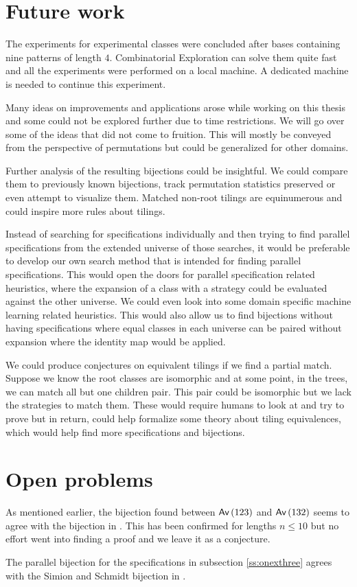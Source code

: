 \label{ch:conclusion}

\section{Future work}\label{s:fw}
The experiments for experimental classes were concluded after bases containing nine patterns of length $4$. Combinatorial Exploration can solve them quite fast and all the experiments were performed on a local machine. A dedicated machine is needed to continue this experiment.

Many ideas on improvements and applications arose while working on this thesis and some could not be explored further due to time restrictions. We will go over some of the ideas that did not come to fruition. This will mostly be conveyed from the perspective of permutations but could be generalized for other domains.

Further analysis of the resulting bijections could be insightful. We could compare them to previously known bijections, track permutation statistics preserved or even attempt to visualize them. Matched non-root tilings are equinumerous and could inspire more rules about tilings.

Instead of searching for specifications individually and then trying to find parallel specifications from the extended universe of those searches, it would be preferable to develop our own search method that is intended for finding parallel specifications. This would open the doors for parallel specification related heuristics, where the expansion of a class with a strategy could be evaluated against the other universe. We could even look into some domain specific machine learning related heuristics. This would also allow us to find bijections without having specifications where equal classes in each universe can be paired without expansion where the identity map would be applied.

We could produce conjectures on equivalent tilings if we find a partial match. Suppose we know the root classes are isomorphic and at some point, in the trees, we can match all but one children pair. This pair could be isomorphic but we lack the strategies to match them. These would require humans to look at and try to prove but in return, could help formalize some theory about tiling equivalences, which would help find more specifications and bijections.

\section{Open problems}
As mentioned earlier, the bijection found between $\textsf{Av}\left(123\right)$ and $\textsf{Av}\left(132\right)$ seems to agree with the \citeauthor{simionandschmidt} bijection in \cite{simionandschmidt}. This has been confirmed for lengths $n \leq 10$ but no effort went into finding a proof and we leave it as a conjecture.
\begin{conjecture}\label{con:ss}
The parallel bijection for the specifications in subsection \ref{ss:onexthree} agrees with the Simion and Schmidt bijection in \cite{simionandschmidt}.
\end{conjecture}

